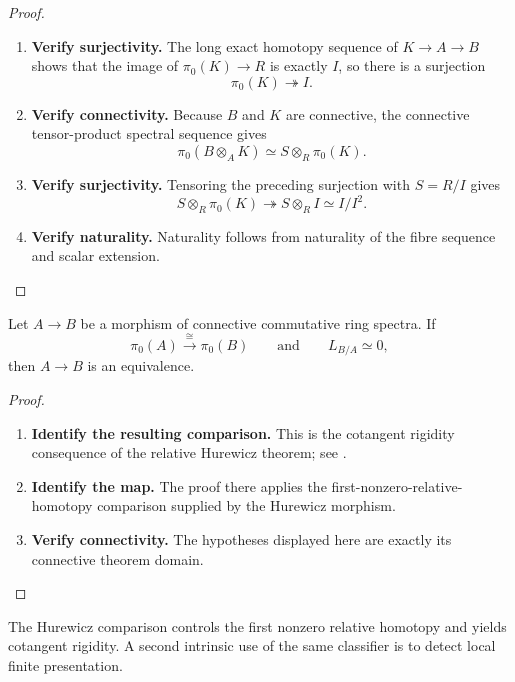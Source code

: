 \begin{proof}
\leavevmode
\begin{enumerate}[label=\textup{(\arabic*)}]
    \item \textbf{Verify surjectivity.}
    The long exact homotopy sequence of \(K\to A\to B\) shows that the image of \(\pi_0(K)\to R\) is
    exactly \(I\), so there is a surjection
    \[
        \pi_0(K)\twoheadrightarrow I.
    \]

    \item \textbf{Verify connectivity.}
    Because \(B\) and \(K\) are connective, the connective tensor-product spectral
    sequence gives
    \[
        \pi_0(B\otimes_AK)
        \simeq
        S\otimes_R\pi_0(K).
    \]

    \item \textbf{Verify surjectivity.}
    Tensoring the preceding surjection with \(S=R/I\) gives
    \[
        S\otimes_R\pi_0(K)
        \twoheadrightarrow
        S\otimes_RI
        \simeq
        I/I^2.
    \]

    \item \textbf{Verify naturality.}
    Naturality follows from naturality of the fibre sequence and scalar extension.
\end{enumerate}
\end{proof}

\begin{corollary}
\label{cor:cotangent-rigidity}
Let \(A\to B\) be a morphism of connective commutative ring spectra. If
\[
    \pi_0(A)\xrightarrow{\cong}\pi_0(B)
    \qquad\text{and}\qquad
    L_{B/A}\simeq0,
\]
then \(A\to B\) is an equivalence.
\end{corollary}

\begin{proof}
\leavevmode
\begin{enumerate}[label=\textup{(\arabic*)}]
    \item \textbf{Identify the resulting comparison.}
    This is the cotangent rigidity consequence of the relative Hurewicz theorem; see
    \cite[Corollary~7.4.3.4]{LurieHigherAlgebra}.

    \item \textbf{Identify the map.}
    The proof there applies the first-nonzero-relative-homotopy comparison supplied by the
    Hurewicz morphism.

    \item \textbf{Verify connectivity.}
    The hypotheses displayed here are exactly its connective theorem domain.
\end{enumerate}
\end{proof}
The Hurewicz comparison controls the first nonzero relative homotopy and yields
cotangent rigidity. A second intrinsic use of the same classifier is to
detect local finite presentation.

